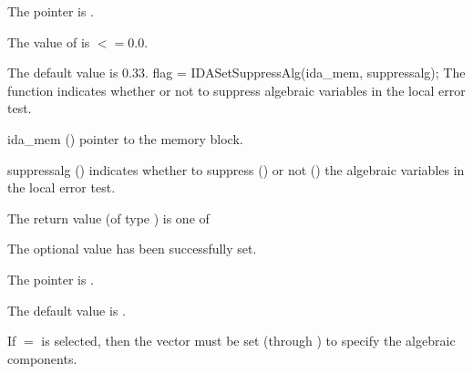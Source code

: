 {{\begin{args}
    The  pointer is .
  \item[\Id{IDA\_ILL\_INPUT}]
    The value of  is $<= 0.0$.
  \end{args}
}
{
  The default value is $0.33$.
}
{
flag = IDASetSuppressAlg(ida\_mem, suppressalg);
}
{
  The function  indicates whether or not to
  suppress algebraic variables in the local error test.
}
{
  \begin{args}[suppressalg]
  \item[ida\_mem] ()
    pointer to the {\ida} memory block.
  \item[suppressalg] ()
    indicates whether to suppress () or not
    () the algebraic variables in the local error test.
  \end{args}
}
{
  The return value  (of type ) is one of
  \begin{args}
  \item[\Id{IDA\_SUCCESS}]
    The optional value has been successfully set.
  \item[\Id{IDA\_MEM\_NULL}]
    The  pointer is .
  \end{args}
}
{
  The default value is .

  If $=$ is selected, then the  vector
  must be set (through ) to specify the algebraic components.

}}

